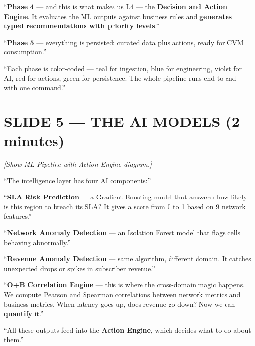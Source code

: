\documentclass[12pt,a4paper]{article}
\newcommand{\stage}[1]{\par\textit{\color{stagedir}[#1]}\par}
\newcommand{\beat}{\par\vspace{0.4em}}
\newcommand{\keyword}[1]{\textbf{\color{aiviolet}#1}}
\newcommand{\emphasis}[1]{\textbf{\color{huaweired}#1}}
\begin{document}
\beat

``\keyword{Phase 4} --- and this is what makes us L4 --- the \keyword{Decision
    and Action Engine}. It evaluates the ML outputs against business rules and
\emphasis{generates typed recommendations with priority levels}.''

\beat

``\keyword{Phase 5} --- everything is persisted: curated data plus actions,
ready for CVM consumption.''

\beat

``Each phase is color-coded --- teal for ingestion, blue for engineering,
violet for AI, red for actions, green for persistence. The whole pipeline runs
end-to-end with one command.''

\newpage
\section{SLIDE 5 --- THE AI MODELS (2 minutes)}

\stage{Show ML Pipeline with Action Engine diagram.}

``The intelligence layer has four AI components:''

\beat

``\keyword{SLA Risk Prediction} --- a Gradient Boosting model that answers: how
likely is this region to breach its SLA? It gives a score from 0 to 1 based on
9 network features.''

\beat

``\keyword{Network Anomaly Detection} --- an Isolation Forest model that flags
cells behaving abnormally.''

\beat

``\keyword{Revenue Anomaly Detection} --- same algorithm, different domain. It
catches unexpected drops or spikes in subscriber revenue.''

\beat

``\keyword{O+B Correlation Engine} --- this is where the cross-domain magic
happens. We compute Pearson and Spearman correlations between network metrics
and business metrics. When latency goes up, does revenue go down? Now we can
\emphasis{quantify} it.''

\beat

``All these outputs feed into the \keyword{Action Engine}, which decides what
to do about them.''

\newpage
\end{document}

